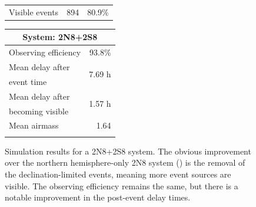 \begin{colsection}
\begin{colsection}
\begin{figure}[p]
\begin{center}
\begin{minipage}[t]{0.45\textwidth}
\begin{tabular}{lrr}
                \midrule
                Visible events & 894 &  80.9\% \\
            \end{tabular}
        \end{minipage}
        \begin{minipage}[t]{0.37\textwidth}\vspace{0pt}
            \begin{tabular}{lr}
                \multicolumn{2}{c}{\textbf{System: 2N8+2S8}} \\
                \midrule
                Observing efficiency & 93.8\% \\
                \midrule
                Mean delay after     & \multirow{2}{*}{7.69 h} \\
                event time           & \\
                Mean delay after     & \multirow{2}{*}{1.57 h} \\
                becoming visible     & \\
                \midrule
                Mean airmass         & 1.64 \\
                & \\
            \end{tabular}
        \end{minipage}
    \end{center}
    \caption[GW simulation results: 2N8+2S8 system]{
        Simulation results for a 2N8+2S8 system. The obvious improvement over the northern hemisphere-only 2N8 system () is the removal of the declination-limited events, meaning more event sources are visible. The observing efficiency remains the same, but there is a notable improvement in the post-event delay times.
    }\label{fig:gw_sim_2n8+2s8}
\end{figure}


\end{colsection}
\end{colsection}
